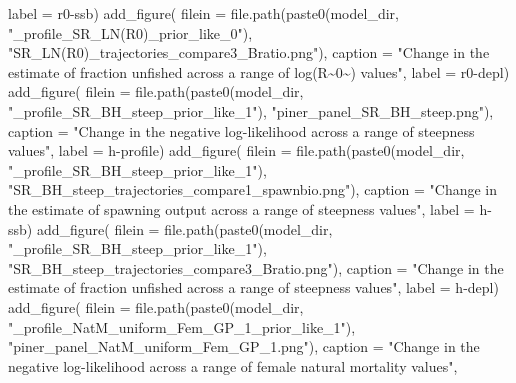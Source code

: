 \documentclass[
  letterpaper,
]{article}
\newenvironment{Shaded}{\begin{snugshade}}{\end{snugshade}}
\newcommand{\AttributeTok}[1]{\textcolor[rgb]{0.77,0.63,0.00}{#1}}
\newcommand{\FunctionTok}[1]{\textcolor[rgb]{0.00,0.00,0.00}{#1}}
\newcommand{\NormalTok}[1]{#1}
\newcommand{\StringTok}[1]{\textcolor[rgb]{0.31,0.60,0.02}{#1}}
\begin{document}
\begin{Shaded}
\begin{Highlighting}[]
\AttributeTok{label =} \StringTok{\textquotesingle{}r0{-}ssb\textquotesingle{}}\NormalTok{)}
\FunctionTok{add\_figure}\NormalTok{(}
\AttributeTok{filein =} \FunctionTok{file.path}\NormalTok{(}\FunctionTok{paste0}\NormalTok{(model\_dir, }\StringTok{"\_profile\_SR\_LN(R0)\_prior\_like\_0"}\NormalTok{),  }\StringTok{"SR\_LN(R0)\_trajectories\_compare3\_Bratio.png"}\NormalTok{), }
\AttributeTok{caption =} \StringTok{"Change in the estimate of fraction unfished across a range of log(R\textasciitilde{}0\textasciitilde{}) values"}\NormalTok{,}
\AttributeTok{label =} \StringTok{\textquotesingle{}r0{-}depl\textquotesingle{}}\NormalTok{)}
\FunctionTok{add\_figure}\NormalTok{(}
\AttributeTok{filein =} \FunctionTok{file.path}\NormalTok{(}\FunctionTok{paste0}\NormalTok{(model\_dir, }\StringTok{"\_profile\_SR\_BH\_steep\_prior\_like\_1"}\NormalTok{),  }\StringTok{"piner\_panel\_SR\_BH\_steep.png"}\NormalTok{), }
\AttributeTok{caption =} \StringTok{"Change in the negative log{-}likelihood across a range of steepness values"}\NormalTok{,}
\AttributeTok{label =} \StringTok{\textquotesingle{}h{-}profile\textquotesingle{}}\NormalTok{)}
\FunctionTok{add\_figure}\NormalTok{(}
\AttributeTok{filein =} \FunctionTok{file.path}\NormalTok{(}\FunctionTok{paste0}\NormalTok{(model\_dir, }\StringTok{"\_profile\_SR\_BH\_steep\_prior\_like\_1"}\NormalTok{),  }\StringTok{"SR\_BH\_steep\_trajectories\_compare1\_spawnbio.png"}\NormalTok{), }
\AttributeTok{caption =} \StringTok{"Change in the estimate of spawning output across a range of steepness values"}\NormalTok{,}
\AttributeTok{label =} \StringTok{\textquotesingle{}h{-}ssb\textquotesingle{}}\NormalTok{)}
\FunctionTok{add\_figure}\NormalTok{(}
\AttributeTok{filein =} \FunctionTok{file.path}\NormalTok{(}\FunctionTok{paste0}\NormalTok{(model\_dir, }\StringTok{"\_profile\_SR\_BH\_steep\_prior\_like\_1"}\NormalTok{),  }\StringTok{"SR\_BH\_steep\_trajectories\_compare3\_Bratio.png"}\NormalTok{), }
\AttributeTok{caption =} \StringTok{"Change in the estimate of fraction unfished across a range of steepness values"}\NormalTok{,}
\AttributeTok{label =} \StringTok{\textquotesingle{}h{-}depl\textquotesingle{}}\NormalTok{)}
\FunctionTok{add\_figure}\NormalTok{(}
\AttributeTok{filein =} \FunctionTok{file.path}\NormalTok{(}\FunctionTok{paste0}\NormalTok{(model\_dir, }\StringTok{"\_profile\_NatM\_uniform\_Fem\_GP\_1\_prior\_like\_1"}\NormalTok{),  }\StringTok{"piner\_panel\_NatM\_uniform\_Fem\_GP\_1.png"}\NormalTok{), }
\AttributeTok{caption =} \StringTok{"Change in the negative log{-}likelihood across a range of female natural mortality values"}\NormalTok{,}

\end{Highlighting}
\end{Shaded}
\end{document}
